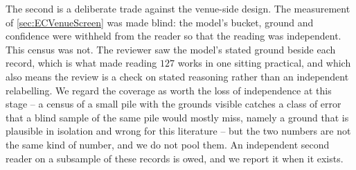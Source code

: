 The second is a deliberate trade against the venue-side design. The measurement of
\cref{sec:ECVenueScreen} was made blind: the model's bucket, ground and confidence were withheld from the
reader so that the reading was independent. This census was not. The reviewer saw the model's stated
ground beside each record, which is what made reading \(127\) works in one sitting practical, and
which also means the review is a check on stated reasoning rather than an independent relabelling.
We regard the coverage as worth the loss of independence at this stage -- a census of a small pile
with the grounds visible catches a class of error that a blind sample of the same pile would
mostly miss, namely a ground that is plausible in isolation and wrong for this literature -- but
the two numbers are not the same kind of number, and we do not pool them. An independent second
reader on a subsample of these records is owed, and we report it when it exists.
